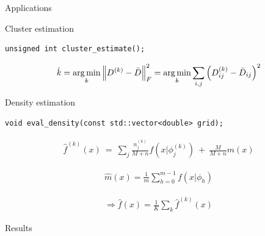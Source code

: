\begin{frame}[c]
	\begin{center}
		\huge \color{blue} Applications
	\end{center}
\end{frame}


\begin{frame}[fragile]{Cluster estimation}

\begin{verbatim}
unsigned int cluster_estimate();
\end{verbatim}

$$ \hat{k} = \operatorname*{arg\,min}_k \left \lVert D^{(k)} - \bar D \right\rVert_F^2= \operatorname*{arg\,min}_k \sum_{i,j} \left( D^{(k)}_{ij} - \bar{D}_{ij}  \right)^2$$


\end{frame}

\begin{frame}[fragile]{Density estimation}

\begin{verbatim}
void eval_density(const std::vector<double> grid);

\end{verbatim}

\begin{equation}
	\begin{aligned} \nonumber
	\hat f^{(k)}(x) \ = \ \sum_j \frac{n^{(k)}_j}{M+n} f\left(x | \phi^{(k)}_j\right) \ + \ \frac{M}{M+n} m(x)
	\end{aligned}
\end{equation}

\begin{equation}
	\begin{aligned} \nonumber
		\hat m(x) = \frac{1}{m} \sum_{h=0}^{m-1}  f\left(x | \phi_h\right)
	\end{aligned}
\end{equation}

\begin{equation}
	\begin{aligned} \nonumber
 \Longrightarrow \hat f(x) = \frac{1}{K} \sum_k \hat f^{(k)}(x) 
\end{aligned}
\end{equation}

\end{frame}

\begin{frame}[c]
	\begin{center}
		\huge \color{blue} Results
	\end{center}
\end{frame}


